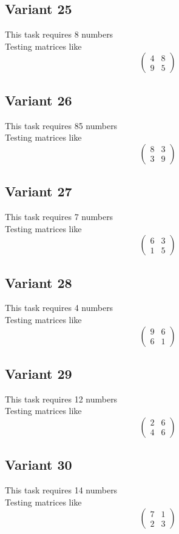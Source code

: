 \documentclass[11pt]{article}
\begin{document}
\subsection*{Variant 25}
This task requires 8 numbers\\
Testing matrices like \[ \begin{pmatrix} 4 & 8\\ 9 & 5 \end{pmatrix} \]

\subsection*{Variant 26}
This task requires 85 numbers\\
Testing matrices like \[ \begin{pmatrix} 8 & 3\\ 3 & 9 \end{pmatrix} \]

\subsection*{Variant 27}
This task requires 7 numbers\\
Testing matrices like \[ \begin{pmatrix} 6 & 3\\ 1 & 5 \end{pmatrix} \]

\subsection*{Variant 28}
This task requires 4 numbers\\
Testing matrices like \[ \begin{pmatrix} 9 & 6\\ 6 & 1 \end{pmatrix} \]

\subsection*{Variant 29}
This task requires 12 numbers\\
Testing matrices like \[ \begin{pmatrix} 2 & 6\\ 4 & 6 \end{pmatrix} \]

\subsection*{Variant 30}
This task requires 14 numbers\\
Testing matrices like \[ \begin{pmatrix} 7 & 1\\ 2 & 3 \end{pmatrix} \]
\end{document}
